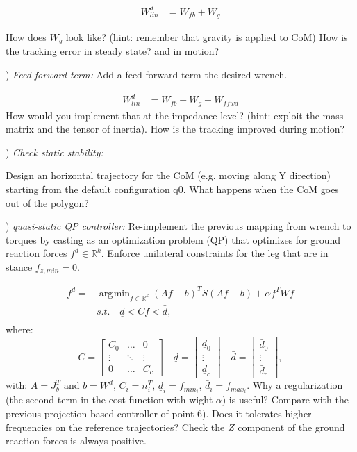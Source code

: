 \documentclass{report}
\newcommand{\Rnum}{\mathbb{R}} %
\newcommand{\mat}[1]{\ensuremath{\begin{bmatrix}#1\end{bmatrix}}}	%
\DeclareMathOperator*{\argmin}{\arg\!\min}				%
\begin{document}
\begin{align}
W^d_{lin} &= W_{fb} +  W_g
\end{align}

How does $W_g$ look like? (hint: remember that gravity is applied to CoM)
How is the tracking error in steady state? and in motion?

\quad

) \textit{Feed-forward term:}
Add a feed-forward term the desired wrench. 

\begin{align}
W^d_{lin} &= W_{fb} +  W_g + W_{ffwd}
\end{align}
How would you implement that at the impedance level? (hint: exploit the mass matrix and the tensor of inertia).
How is the tracking improved during motion?

\quad

) \textit{Check static stability:}

Design an horizontal trajectory for the CoM (e.g. moving along Y direction) starting from the default configuration q0. 
What happens when the CoM goes out of the polygon?

) \textit{quasi-static QP controller:}
Re-implement the previous mapping from wrench to torques by casting as an optimization problem (QP) that optimizes for ground reaction forces $f^d \in \Rnum^k$. 
Enforce unilateral constraints for the leg that are in stance $f_{z,min} = 0$. 

\begin{equation} 
\begin{aligned} 
f^d = & \argmin_{f \in \Rnum^k} (Af-b)^T S (Af-b) + \alpha f^T W f\\
& s.t. \quad \underline{d} < C f < \bar{d},\\
\end{aligned} 
\label{eq:min_prob}
\end{equation}
%
where:
\begin{equation}
C = \mat{C_0 & \dots & 0 \\ \vdots & \ddots & \vdots \\ 0 & \dots & C_c} \quad
\underline{d} = \mat{ \underline{d}_0 \\ \vdots \\ \underline{d}_c} \quad
\bar{d} = \mat{\bar{d}_0 \\ \vdots \\ \bar{d}_c},
\end{equation}
%
with: $A = J_b^T$ and $b = W^d$, $C_i = 	n_i^T$, $\underline{d}_i = 	f_{{min}_i}$, $\bar{d}_i =f_{{max}_i}$. 
Why a regularization (the second term in the cost function with wight $\alpha$) is useful?
Compare with the previous projection-based controller of point 6). 
Does it tolerates higher frequencies on the reference trajectories?
Check the $Z$ component of the ground reaction forces is always positive.
\end{document}
